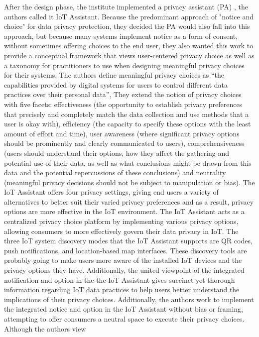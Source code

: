 After the design phase, the institute implemented a privacy assistant (PA) \cite{FengDesign},
the authors called it IoT Assistant. Because the predominant approach of
"notice and choice" for data privacy protection, they decided the PA would
also fall into this approach, but because many systems implement notice
as a form of consent, without sometimes offering choices to the end user,
they also wanted this work to provide a conceptual framework that views
user-centered privacy choice as well as a taxonomy for practitioners to
use when designing meaningful privacy choices for their systems. The authors
define meaningful privacy choices as ``the capabilities provided by digital
systems for users to control different data practices over their personal
data'', They extend the notion of privacy choices with five facets: effectiveness
(the opportunity to establish privacy preferences that precisely and completely
match the data collection and use methods that a user is okay with), efficiency
(the capacity to specify these options with the least amount of effort and
time), user awareness (where significant privacy options should be prominently
and clearly communicated to users), comprehensiveness (users should understand
their options, how they affect the gathering and potential use of their
data, as well as what conclusions might be drawn from this data and the
potential repercussions of these conclusions) and neutrality (meaningful
privacy decisions should not be subject to manipulation or bias). The IoT
Assistant offers four privacy settings, giving end users a variety of alternatives
to better suit their varied privacy preferences and as a result, privacy
options are more effective in the IoT environment. The IoT Assistant acts
as a centralized privacy choice platform by implementing various privacy
options, allowing consumers to more effectively govern their data privacy
in IoT. The three IoT system discovery modes that the IoT Assistant supports
are QR codes, push notifications, and location-based map interfaces. These
discovery tools are probably going to make users more aware of the installed
IoT devices and the privacy options they have. Additionally, the united
viewpoint of the integrated notification and option in the the IoT Assistant
gives succinct yet thorough information regarding IoT data practices to
help users better understand the implications of their privacy choices.
Additionally, the authors work to implement the integrated notice and option
in the IoT Assistant without bias or framing, attempting to offer consumers
a neutral space to execute their privacy choices. Although the authors view
